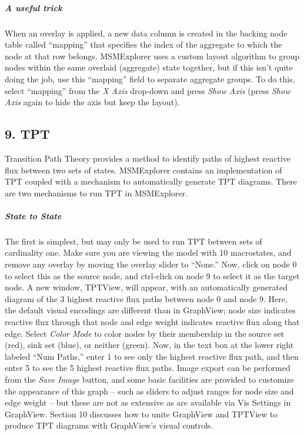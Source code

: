 \documentclass[10pt,a4paper]{report}
\begin{document}
\subparagraph*{A useful trick}
When an overlay is applied, a new data column is created in the backing node table called ``mapping'' that specifies the index of the aggregate to which the node at that row belongs. MSMExplorer uses a custom layout algorithm to group nodes within the same overlaid (aggregate) state together, but if this isn't quite doing the job, use this ``mapping'' field to separate aggregate groups. To do this, select ``mapping'' from the \emph{X Axis} drop-down and press \emph{Show Axis} (press \emph{Show Axis} again to hide the axis but keep the layout).  

\subsection*{9. TPT}
Transition Path Theory provides a method to identify paths of highest reactive flux between two sets of states. MSMExplorer contains an implementation of TPT coupled with a mechanism to automatically generate TPT diagrams. There are two mechanisms to run TPT in MSMExplorer. 

\subparagraph*{State to State} 
The first is simplest, but may only be used to run TPT between sets of cardinality one. Make sure you are viewing the model with 10 macrostates, and remove any overlay by moving the overlay slider to ``None.'' Now, click on node 0 to select this as the source node, and ctrl-click on node 9 to select it as the target node. A new window, TPTView, will appear, with an automatically generated diagram of the 3 highest reactive flux paths between node 0 and node 9.  Here, the default visual encodings are different than in GraphView; node size indicates reactive flux through that node and edge weight indicates reactive flux along that edge. Select \emph{Color Mode} to color nodes by their membership in the source set (red), sink set (blue), or neither (green). Now, in the text box at the lower right labeled ``Num Paths,'' enter 1 to see only the highest reactive flux path, and then enter 5 to see the 5 highest reactive flux paths.  Image export can be performed from the \emph{Save Image} button, and some basic facilities are provided to customize the appearance of this graph -- such as sliders to adjust ranges for node size and edge weight -- but these are not as extensive as are available via Vis Settings in GraphView. Section 10 discusses how to unite GraphView and TPTView to produce TPT diagrams with GraphView's visual controls. 
\end{document}
